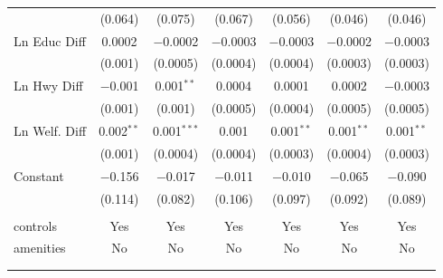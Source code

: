 \begin{table}[!htbp]
\begin{tabular}{@{\extracolsep{5pt}}lcccccc}
  & (0.064) & (0.075) & (0.067) & (0.056) & (0.046) & (0.046) \\ 
  Ln Educ Diff & 0.0002 & $-$0.0002 & $-$0.0003 & $-$0.0003 & $-$0.0002 & $-$0.0003 \\ 
  & (0.001) & (0.0005) & (0.0004) & (0.0004) & (0.0003) & (0.0003) \\ 
  Ln Hwy Diff & $-$0.001 & 0.001$^{**}$ & 0.0004 & 0.0001 & 0.0002 & $-$0.0003 \\ 
  & (0.001) & (0.001) & (0.0005) & (0.0004) & (0.0005) & (0.0005) \\ 
  Ln Welf. Diff & 0.002$^{**}$ & 0.001$^{***}$ & 0.001 & 0.001$^{**}$ & 0.001$^{**}$ & 0.001$^{**}$ \\ 
  & (0.001) & (0.0004) & (0.0004) & (0.0003) & (0.0004) & (0.0003) \\ 
  Constant & $-$0.156 & $-$0.017 & $-$0.011 & $-$0.010 & $-$0.065 & $-$0.090 \\ 
  & (0.114) & (0.082) & (0.106) & (0.097) & (0.092) & (0.089) \\ 
 \hline \\[-1.8ex] 
controls & Yes & Yes & Yes & Yes & Yes & Yes \\ 
amenities & No & No & No & No & No & No \\ 
\hline \\[-1.8ex] 
\hline 
\hline \\[-1.8ex] 
\end{tabular} 
\end{table} 

